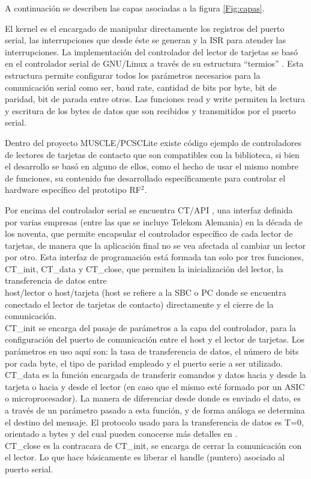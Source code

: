 \bigskip
A continuación se describen las capas asociadas a la figura \ref{Fig:capas}.

\bigskip
{}
El kernel es el encargado de manipular directamente los registros del puerto serial, las interrupciones que desde éste se generan y la ISR para atender las interrupciones.
La implementación del controlador del lector de tarjetas se basó en el controlador serial de GNU/Linux a través de su estructura “termios” \cite{termios}. Esta estructura permite configurar todos los parámetros necesarios para la comunicación serial como ser, baud rate, cantidad de bits por byte, bit de paridad, bit de parada entre otros. Las funciones read y write permiten la lectura y escritura de los bytes de datos que son recibidos y transmitidos por el puerto serial.

Dentro del proyecto MUSCLE/PCSCLite existe código ejemplo de controladores de lectores de tarjetas de contacto que son compatibles con la biblioteca, si bien el desarrollo se basó en alguno de ellos, como el hecho de usar el mismo nombre de funciones, su contenido fue desarrollado específicamente para controlar el hardware específico del prototipo RF$^{2}$.

\bigskip
{}
Por encima del controlador serial se encuentra CT/API \cite{ctapi}, una interfaz definida por varias empresas (entre las que se incluye Telekom Alemania) en la década de los noventa, que permite encapsular el controlador específico de cada lector de tarjetas, de manera que la aplicación final no se vea afectada al cambiar un lector por otro.
Esta interfaz de programación está formada tan solo por tres funciones, CT\_init, CT\_data y CT\_close, que permiten la inicialización del lector, la transferencia de datos entre \\
host/lector o host/tarjeta (host se refiere a la SBC o PC donde se encuentra conectado el lector de tarjetas de contacto) directamente y el cierre de la comunicación.\\
CT\_init se encarga del pasaje de parámetros a la capa del controlador, para la configuración del puerto de comunicación entre el host y el lector de tarjetas. Los parámetros en uso aquí son: la tasa de transferencia de datos, el número de bits por cada byte, el tipo de paridad empleado y el puerto serie a ser utilizado.\\
CT\_data es la función encargada de transferir comandos y datos hacia y desde la tarjeta o hacia y desde el lector (en caso que el mismo esté formado por un ASIC o microprocesador). La manera de diferenciar desde donde es enviado el dato, es a través de un parámetro pasado a esta función, y de forma análoga se determina el destino del mensaje. El protocolo usado para la transferencia de datos es T=0, orientado a bytes y del cual pueden conocerse más detalles en \cite{SCHb}.\\
CT\_close es la contracara de  CT\_init, se encarga de cerrar la comunicación con el lector. Lo que hace básicamente es liberar el handle (puntero) asociado al puerto serial.

